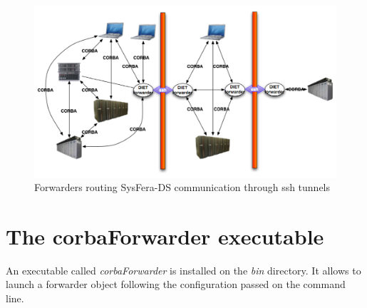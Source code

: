 \documentclass{report}
\begin{document}
\begin{figure}[htp]
\begin{center}
  \includegraphics[width=12cm]{fig/Forwarder}
\end{center}
\caption{Forwarders routing SysFera-DS communication through ssh tunnels
  \label{fig:forwarder}}
\end{figure}

\section*{The corbaForwarder executable}
\label{sec:ForwarderConfig}
An executable called \textit{corbaForwarder}
is installed on the \textit{bin} directory. It allows to launch a
forwarder object following the configuration passed on the command
line.
\end{document}
